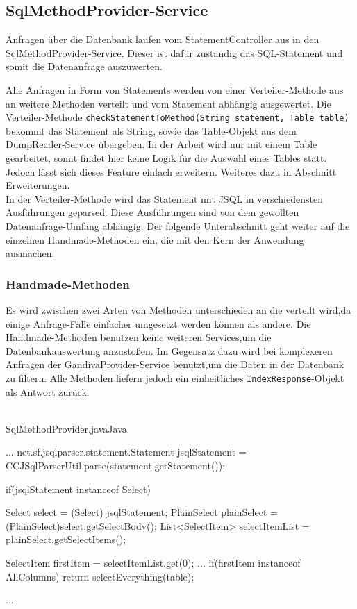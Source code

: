 \subsection{SqlMethodProvider-Service}
\label{SqlMethodProvider-Service}
Anfragen über die Datenbank laufen vom StatementController aus in den SqlMethodProvider-Service. Dieser ist dafür zuständig das SQL-Statement und somit die Datenanfrage auszuwerten.

Alle Anfragen in Form von Statements werden von einer Verteiler-Methode aus an weitere Methoden verteilt und vom Statement abhängig ausgewertet.
Die Verteiler-Methode \texttt{checkStatementToMethod(String statement, Table table)} bekommt das Statement als String, sowie das Table-Objekt aus dem DumpReader-Service übergeben. In der Arbeit wird nur mit einem Table gearbeitet, somit findet hier keine Logik für die Auswahl eines Tables statt. Jedoch lässt sich dieses Feature einfach erweitern. Weiteres dazu in Abschnitt Erweiterungen.\\

In der Verteiler-Methode wird das Statement mit JSQL in verschiedensten Ausführungen geparsed. Diese Ausführungen sind von dem gewollten Datenanfrage-Umfang abhängig. Der folgende Unterabschnitt geht weiter auf die einzelnen Handmade-Methoden ein, die mit den Kern der Anwendung ausmachen.


\subsubsection{Handmade-Methoden}


Es wird zwischen zwei Arten von Methoden unterschieden an die verteilt wird,da einige Anfrage-Fälle einfacher umgesetzt werden können als andere.
Die Handmade-Methoden benutzen keine weiteren Services,um die Datenbankauswertung anzustoßen. Im Gegensatz dazu wird bei komplexeren Anfragen der GandivaProvider-Service benutzt,um die Daten in der Datenbank zu filtern.
Alle Methoden liefern jedoch ein einheitliches \texttt{IndexResponse}-Objekt als Antwort zurück.\\\\

\begin{codeblock}{SqlMethodProvider.java}{Java}
  \begin{javacode}
    ...
net.sf.jsqlparser.statement.Statement jsqlStatement = CCJSqlParserUtil.parse(statement.getStatement()); 

if(jsqlStatement instanceof Select) {

            Select select = (Select) jsqlStatement;
            PlainSelect plainSelect = (PlainSelect)select.getSelectBody();
            List<SelectItem> selectItemList = plainSelect.getSelectItems();

            SelectItem firstItem = selectItemList.get(0);
			...
            if(firstItem instanceof AllColumns){
                return selectEverything(table);
            }
}
    ...
  \end{javacode}
\end{codeblock}


